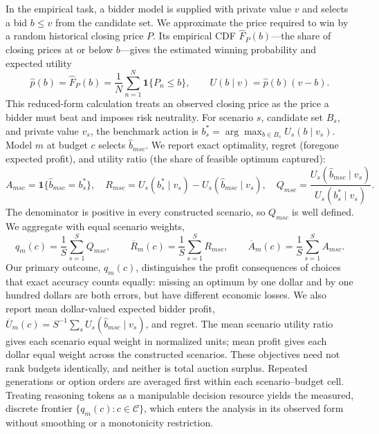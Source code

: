 \documentclass{article}
\begin{document}
In the empirical task, a bidder model is supplied with private value $v$ and selects a bid $b\leq v$ from the candidate set. We approximate the price required to win by a random historical closing price $P$. Its empirical CDF $\widehat F_P(b)$---the share of closing prices at or below $b$---gives the estimated winning probability and expected utility
\begin{equation}
 \widehat p(b)=\widehat F_P(b)=\frac{1}{N}\sum_{n=1}^{N}\mathbf{1}\{P_n\leq b\},
 \qquad U(b\mid v)=\widehat p(b)(v-b).
 \label{eq:auctionutility}
\end{equation}
This reduced-form calculation treats an observed closing price as the price a bidder must beat and imposes risk neutrality. For scenario $s$, candidate set $B_s$, and private value $v_s$, the benchmark action is $b_s^*=\arg\max_{b\in B_s}U_s(b\mid v_s)$. Model $m$ at budget $c$ selects $\widehat b_{msc}$. We report exact optimality, regret (foregone expected profit), and utility ratio (the share of feasible optimum captured):
\begin{equation}
 A_{msc}=\mathbf{1}\{\widehat b_{msc}=b_s^*\},\quad
 R_{msc}=U_s(b_s^*\mid v_s)-U_s(\widehat b_{msc}\mid v_s),\quad
 Q_{msc}=\frac{U_s(\widehat b_{msc}\mid v_s)}{U_s(b_s^*\mid v_s)}.
 \label{eq:metrics}
\end{equation}
The denominator is positive in every constructed scenario, so $Q_{msc}$ is well defined. We aggregate with equal scenario weights,
\begin{equation}
 q_m(c)=\frac{1}{S}\sum_{s=1}^{S}Q_{msc},\qquad
 \overline R_m(c)=\frac{1}{S}\sum_{s=1}^{S}R_{msc},\qquad
 \overline A_m(c)=\frac{1}{S}\sum_{s=1}^{S}A_{msc}.
 \label{eq:frontier}
\end{equation}
Our primary outcome, $q_m(c)$, distinguishes the profit consequences of choices that exact accuracy counts equally: missing an optimum by one dollar and by one hundred dollars are both errors, but have different economic losses. We also report mean dollar-valued expected bidder profit, $\overline U_m(c)=S^{-1}\sum_s U_s(\widehat b_{msc}\mid v_s)$, and regret. The mean scenario utility ratio gives each scenario equal weight in normalized units; mean profit gives each dollar equal weight across the constructed scenarios. These objectives need not rank budgets identically, and neither is total auction surplus. Repeated generations or option orders are averaged first within each scenario--budget cell. Treating reasoning tokens as a manipulable decision resource yields the measured, discrete frontier $\{q_m(c):c\in\mathcal C\}$, which enters the analysis in its observed form without smoothing or a monotonicity restriction.
\end{document}
